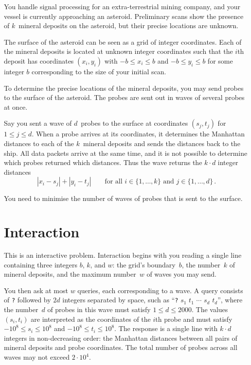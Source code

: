 

\noindent
You handle signal processing for an extra-terrestrial mining company, and your vessel is currently approaching an asteroid. 
Preliminary scans show the presence of $k$~mineral deposits on the asteroid, but their precise locations are unknown.

\medskip

The surface of the asteroid can be seen as a grid of integer coordinates.
Each of the mineral deposits is located at unknown integer coordinates such that the $i$th deposit has coordinates $(x_i, y_i)$ with  
$-b \le x_i \le b$ and $-b\le y_i \le b$ %
for some integer $b$ corresponding to the size of your initial scan.

To determine the precise locations of the mineral deposits, you may send probes to the surface of the asteroid. 
The probes are sent out in waves of several probes at once.

Say you sent a wave of $d$~probes to the surface at coordinates $(s_j,t_j)$ for $1\leq j\leq d$.
When a probe arrives at its coordinates, it determines the Manhattan distances to each of the $k$~mineral deposits and sends the distances back to the ship. 
All data packets arrive at the same time, and it is not possible to determine which probes returned which distances. 
Thus the wave returns the $k\cdot d$ integer distances
\[|x_i-s_j| + |y_i - t_j| \qquad\text{for all } i \in \{1,\ldots,k\} \text{ and } j \in\{ 1,\ldots,d\}\,.\]

You need to minimise the number of waves of probes that is sent to the surface.


\section*{Interaction}

This is an interactive problem.
Interaction begins with you reading a single line containing three integers $b$, $k$, and $w$:
the grid's boundary~$b$,
the number~$k$ of mineral deposits,
and the maximum number~$w$ of waves you may send.

You then ask at most $w$ queries, each corresponding to a wave.
A query consists of \texttt{?} followed by $2d$ integers separated by space, such as ``\texttt{?} $s_1$ $t_1$ $\cdots$ $s_d$ $t_d$'', where the number~$d$ of probes in this wave must satisfy
$1\leq d\leq 2000$. %
The values $(s_i,t_i)$ are interpreted as the coordinates of the $i$th probe and must satisfy
$-10^8 \leq s_i \leq 10^8$ and $-10^8 \leq t_i \leq 10^8$. %
The response is a single line with $k \cdot d$ integers in non-decreasing order: 
the Manhattan distances between all pairs of mineral deposits and probe coordinates.
The total number of probes across all waves may not exceed
$2\cdot 10^4.$ %

